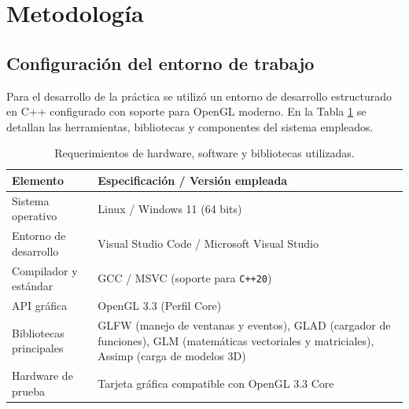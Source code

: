 
\section{Metodología}

\subsection{Configuración del entorno de trabajo}
Para el desarrollo de la práctica se utilizó un entorno de desarrollo estructurado en C++ configurado con soporte para OpenGL moderno. En la Tabla \ref{tab:requerimientos} se detallan las herramientas, bibliotecas y componentes del sistema empleados.

\begin{table}[H]
\centering
\renewcommand{\arraystretch}{1.25}
\begin{tabular}{|p{4.2cm}|p{10.5cm}|}
\hline
\textbf{Elemento} & \textbf{Especificación / Versión empleada} \\ \hline
Sistema operativo & Linux / Windows 11 (64 bits) \\ \hline
Entorno de desarrollo & Visual Studio Code / Microsoft Visual Studio \\ \hline
Compilador y estándar & GCC / MSVC (soporte para \texttt{C++20}) \\ \hline
API gráfica & OpenGL 3.3 (Perfil Core) \\ \hline
Bibliotecas principales & GLFW (manejo de ventanas y eventos), GLAD (cargador de funciones), GLM (matemáticas vectoriales y matriciales), Assimp (carga de modelos 3D) \\ \hline
Hardware de prueba & Tarjeta gráfica compatible con OpenGL 3.3 Core \\ \hline
\end{tabular}
\caption{Requerimientos de hardware, software y bibliotecas utilizadas.}
\label{tab:requerimientos}
\end{table}

